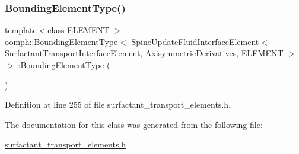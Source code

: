 \subsubsection{\texorpdfstring{Bounding\+Element\+Type()}{BoundingElementType()}}
{\footnotesize\ttfamily template$<$class E\+L\+E\+M\+E\+NT $>$ \\
\hyperlink{classoomph_1_1BoundingElementType}{oomph\+::\+Bounding\+Element\+Type}$<$ \hyperlink{classoomph_1_1SpineUpdateFluidInterfaceElement}{Spine\+Update\+Fluid\+Interface\+Element}$<$ \hyperlink{classoomph_1_1SurfactantTransportInterfaceElement}{Surfactant\+Transport\+Interface\+Element}, \hyperlink{classoomph_1_1AxisymmetricDerivatives}{Axisymmetric\+Derivatives}, E\+L\+E\+M\+E\+NT $>$ $>$\+::\hyperlink{classoomph_1_1BoundingElementType}{Bounding\+Element\+Type} (\begin{DoxyParamCaption}{ }\end{DoxyParamCaption})\hspace{0.3cm}{\ttfamily [inline]}}



Definition at line 255 of file surfactant\+\_\+transport\+\_\+elements.\+h.



The documentation for this class was generated from the following file\+:\begin{DoxyCompactItemize}
\item 
\hyperlink{surfactant__transport__elements_8h}{surfactant\+\_\+transport\+\_\+elements.\+h}\end{DoxyCompactItemize}
